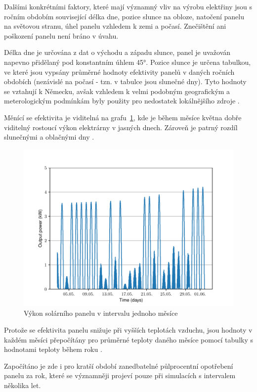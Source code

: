 \documentclass[12pt,a4paper]{article}
\begin{document}
Dalšími konkrétními faktory, které mají významný vliv na výrobu elektřiny jsou s ročním obdobím související délka dne, pozice slunce na obloze, natočení panelu na světovou stranu, úhel panelu vzhledem k zemi a počasí. Znečištění ani poškození panelu není bráno v úvahu.

Délka dne je určována z dat o východu a západu slunce, panel je uvažován napevno přidělaný pod konstantním úhlem 45°.
Pozice slunce je určena tabulkou, ve které jsou vypsány průměrné hodnoty efektivity panelů v daných ročních obdobích (nezávislé na počasí - tzn. v tabulce jsou slunečné dny). Tyto hodnoty se vztahují k Německu, avšak vzhledem k velmi podobným geografickým a meterologickým podmínkám byly použity pro nedostatek lokálnějšího zdroje
\cite{German-solar-hourly-2014}.

 Měnící se efektivita je viditelná na grafu~\ref{fig:solar_month}, kde je během měsíce května dobře viditelný rostoucí výkon elektrárny v jasných dnech. Zároveň je patrný rozdíl slunečnými a oblačnými dny \cite{PF-Bach-2022}.

\begin{figure}[H]
\begin{center}
\includegraphics[width=0.8\linewidth]{img/solar_month.pdf}
\end{center}
\caption{Výkon solárního panelu v intervalu jednoho měsíce}
\label{fig:solar_month}
\end{figure}

Protože se efektivita panelu snižuje při vyšších teplotách vzduchu, jsou hodnoty v každém měsíci přepočítány pro průměrné teploty daného měsíce pomocí tabulky s hodnotami teploty během roku \cite{Cotmas-2018}.

Započítáno je zde i pro kratší období zanedbatelné půlprocentní opotřebení panelu za rok, které se významněji projeví pouze při simulacích s intervalem několika let.
\end{document}
